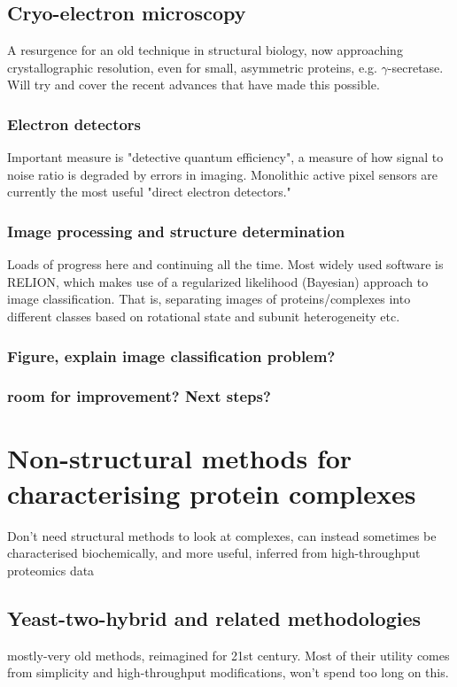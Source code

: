 \documentclass[a4paper,11pt,twoside,openright]{book}
\begin{document}
\subsection{Cryo-electron microscopy}
A resurgence for an old technique in structural biology, now approaching crystallographic resolution, even for small, asymmetric proteins, e.g. \(\gamma\)-secretase. Will try and cover the recent advances that have made this possible.
\subsubsection{Electron detectors}
Important measure is "detective quantum efficiency", a measure of how signal to noise ratio is degraded by errors in imaging. Monolithic active pixel sensors are currently the most useful "direct electron detectors."
\subsubsection{Image processing and structure determination}
Loads of progress here and continuing all the time. Most widely used software is RELION, which makes use of a regularized likelihood (Bayesian) approach to image classification. That is, separating images of proteins/complexes into different classes based on rotational state and subunit heterogeneity etc.
\subsubsection{Figure, explain image classification problem?}
\subsubsection{room for improvement? Next steps?}


\section{Non-structural methods for characterising protein complexes}
Don't need structural methods to look at complexes, can instead sometimes be characterised biochemically, and more useful, inferred from high-throughput proteomics data

\subsection{Yeast-two-hybrid and related methodologies}
mostly-very old methods, reimagined for 21st century. Most of their utility comes from simplicity and high-throughput modifications, won't spend too long on this.
\end{document}
